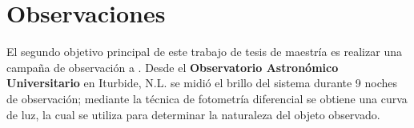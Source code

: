 \chapter{Observaciones}

El segundo objetivo principal de este trabajo de tesis de maestría es realizar
una campaña de observación a \atoObjId. Desde el \textbf{Observatorio
Astronómico Universitario} en Iturbide, N.L. se midió el brillo del sistema
durante 9 noches de observación; mediante la técnica de fotometría diferencial
se obtiene una curva de luz, la cual se utiliza para determinar la naturaleza
del objeto observado.


